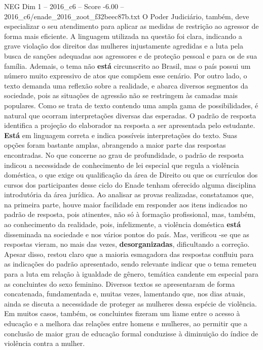 \begin{textsample}{NEG Dim 1 – 2016\_c6 – Score -6.00 – 2016\_c6/enade\_2016\_zoot\_f32beec87b.txt}
O Poder Judiciário, também, deve especializar o seu atendimento para aplicar as medidas de restrição ao agressor de forma mais eficiente.
A linguagem utilizada na questão foi clara, indicando a grave violação dos direitos das mulheres injustamente agredidas e a luta pela busca de sanções adequadas aos agressores e de proteção pessoal e para os de sua família.
Ademais, o tema não \textbf{está} circunscrito ao Brasil, mas o país possui um número muito expressivo de atos que compõem esse cenário.
Por outro lado, o texto demanda uma reflexão sobre a realidade, e abarca diversos segmentos da sociedade, pois as situações de agressão não se restringem às camadas mais populares.
Como se trata de texto contendo uma ampla gama de possibilidades, é natural que ocorram interpretações diversas das esperadas.
O padrão de resposta identifica a projeção do elaborador na resposta a ser apresentada pelo estudante. \textbf{Está} em linguagem correta e indica possíveis interpretações do texto.
Suas opções foram bastante amplas, abrangendo a maior parte das respostas encontradas.
No que concerne ao grau de profundidade, o padrão de resposta indicou a necessidade de conhecimento de lei especial que regula a violência doméstica, o que exige ou qualificação da área de Direito ou que os currículos dos cursos dos participantes desse ciclo do Enade tenham oferecido alguma disciplina introdutória da área jurídica.
Ao analisar as provas realizadas, constatamos que, na primeira parte, houve maior facilidade em responder aos itens indicados no padrão de resposta, pois atinentes, não só à formação profissional, mas, também, ao conhecimento da realidade, pois, infelizmente, a violência doméstica \textbf{está} disseminada na sociedade e nos vários pontos do país.
Mas, verificou -se que as respostas vieram, no mais das vezes, \textbf{desorganizadas}, dificultando a correção.
Apesar disso, restou claro que a maioria esmagadora das respostas confluiu para as indicações do padrão apresentado, sendo relevante indicar que o tema remeteu para a luta em relação à igualdade de gênero, temática candente em especial para as concluintes do sexo feminino.
Diversos textos se apresentaram de forma concatenada, fundamentada e, muitas vezes, lamentando que, nos dias atuais, ainda se discuta a necessidade de proteger as mulheres dessa espécie de violência.
Em muitos casos, também, os concluintes fizeram um liame entre o acesso à educação e a melhora das relações entre homens e mulheres, ao permitir que a conclusão de maior grau de educação formal conduzisse à diminuição do índice de violência contra a mulher.

\end{textsample}
